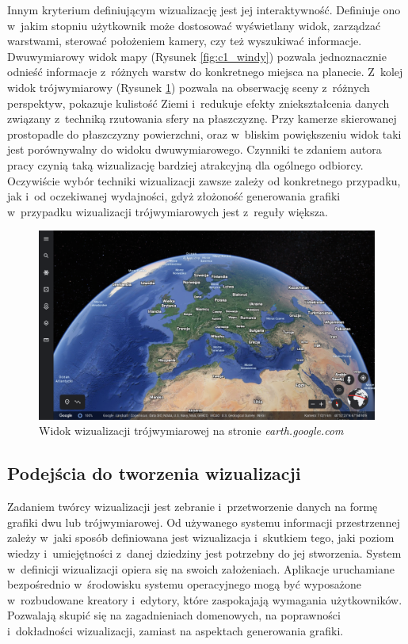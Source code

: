 Innym kryterium definiującym wizualizację jest jej interaktywność. Definiuje ono w~jakim stopniu użytkownik może dostosować wyświetlany widok, zarządzać warstwami, sterować położeniem kamery, czy też wyszukiwać informacje. Dwuwymiarowy widok mapy (Rysunek \ref{fig:c1_windy}) pozwala jednoznacznie odnieść informacje z~różnych warstw do konkretnego miejsca na planecie. Z~kolej widok trójwymiarowy (Rysunek \ref{fig:c1_google_earth}) pozwala na obserwację sceny z~różnych perspektyw, pokazuje kulistość Ziemi i~redukuje efekty zniekształcenia danych związany z~techniką rzutowania sfery na płaszczyznę. Przy kamerze skierowanej prostopadle do płaszczyzny powierzchni, oraz w~bliskim powiększeniu widok taki jest porównywalny do widoku dwuwymiarowego. Czynniki te zdaniem autora pracy czynią taką wizualizację bardziej atrakcyjną dla ogólnego odbiorcy. Oczywiście wybór techniki wizualizacji zawsze zależy od konkretnego przypadku, jak i~od oczekiwanej wydajności, gdyż złożoność generowania grafiki w~przypadku wizualizacji trójwymiarowych jest z~reguły większa.


\begin{figure}[h]
    \centering
    \includegraphics[width=\linewidth]{img/c1_google_earth.png}
    \caption{Widok wizualizacji trójwymiarowej na stronie \textit{earth.google.com}}
    \label{fig:c1_google_earth}
\end{figure}

\subsection{Podejścia do tworzenia wizualizacji}

Zadaniem twórcy wizualizacji jest zebranie i~przetworzenie danych na formę grafiki dwu lub trójwymiarowej. Od używanego systemu informacji przestrzennej zależy w~jaki sposób definiowana jest wizualizacja i~skutkiem tego, jaki poziom wiedzy i~umiejętności z~danej dziedziny jest potrzebny do jej stworzenia. System w~definicji wizualizacji opiera się na swoich założeniach. Aplikacje uruchamiane bezpośrednio w~środowisku systemu operacyjnego mogą być wyposażone w~rozbudowane kreatory i~edytory, które zaspokajają wymagania użytkowników. Pozwalają skupić się na zagadnieniach domenowych, na poprawności i~dokładności wizualizacji, zamiast na aspektach generowania grafiki. 

